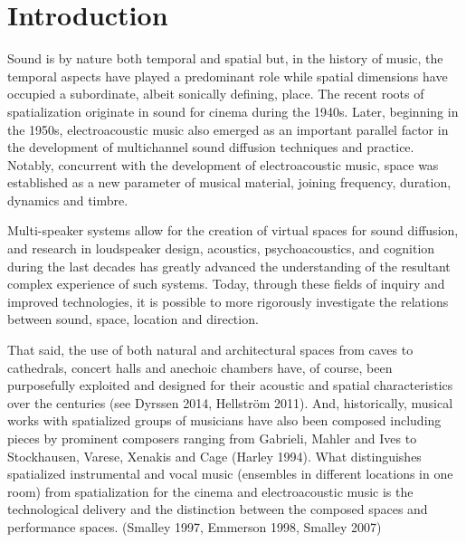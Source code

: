 \documentclass{article}
\title{\papertitle}
\begin{document}
%
\capstartfalse
\maketitle
\capstarttrue
%
\begin{abstract}
Place your abstract at the top left column on the first page.
Please write about 150--200 words that specifically highlight the purpose of your work,
its context, and provide a brief synopsis of your results.
Avoid equations in this part.
\end{abstract}
%

\section{Introduction}
\label{sec:introduction-1}

Sound is by nature both temporal and spatial but, in the history of music, the temporal aspects have played a predominant role while spatial dimensions have occupied a subordinate, albeit sonically defining, place. The recent roots of spatialization originate in sound for cinema during the 1940s. Later, beginning in the 1950s, electroacoustic music also emerged as an important parallel factor in the development of multichannel sound diffusion techniques and practice. Notably, concurrent with the development of electroacoustic music, space was established as a new parameter of musical material, joining frequency, duration, dynamics and timbre.

Multi-speaker systems allow for the creation of virtual spaces for sound diffusion, and research in loudspeaker design, acoustics, psychoacoustics, and cognition during the last decades has greatly advanced the understanding of the resultant complex experience of such systems. Today, through these fields of inquiry and improved technologies, it is possible to more rigorously investigate the relations between sound, space, location and direction.

That said, the use of both natural and architectural spaces from caves to cathedrals, concert halls and anechoic chambers have, of course, been purposefully exploited and designed for their acoustic and spatial characteristics over the centuries (see Dyrssen 2014, Hellström 2011). And, historically, musical works with spatialized groups of musicians have also been composed including pieces by prominent composers ranging from Gabrieli, Mahler and Ives to Stockhausen, Varese, Xenakis and Cage (Harley 1994). What distinguishes spatialized instrumental and vocal music (ensembles in different locations in one room) from spatialization for the cinema and electroacoustic music is the technological delivery and the distinction between the composed spaces and performance spaces. (Smalley 1997, Emmerson 1998, Smalley 2007) 
\end{document}
